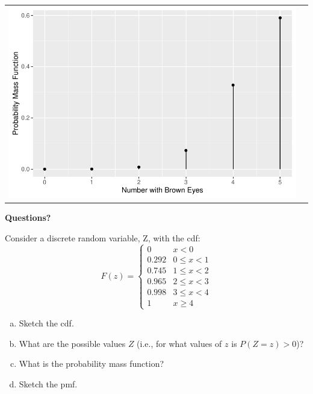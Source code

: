 \begin{frame}
\begin{block}{\examplectd}
\begin{center}
\begin{tabular}{cc}
                                                                           \includegraphics[height=.32\textheight]{figure/example-10-1-5-4} 
      \end{tabular}
    \end{center}
  \end{block}
\end{frame}

\begin{frame}

  \begin{center}
    \Large{\textbf{Questions?}}
  \end{center}
\end{frame}

\begin{frame}

\begin{block}{\exercise}
Consider a discrete random variable, Z, with the cdf:
$$
F(z)=
\left\{
\begin{array}{ll}
0 & x < 0\\
0.292  &   0 \leq x <1\\
0.745  &  1 \leq x <2\\
0.965  &  2 \leq x <3\\
0.998 &   3 \leq x <4\\
1     &    x \geq 4
\end{array}
\right.
$$
\end{block}

\begin{enumerate}[a)]
\item Sketch the cdf.
\item What are the possible values $Z$ (i.e., for what values of $z$ is $P(Z=z)>0$)?
\item What is the probability mass function?
\item Sketch the pmf.
\end{enumerate}
\end{frame}


